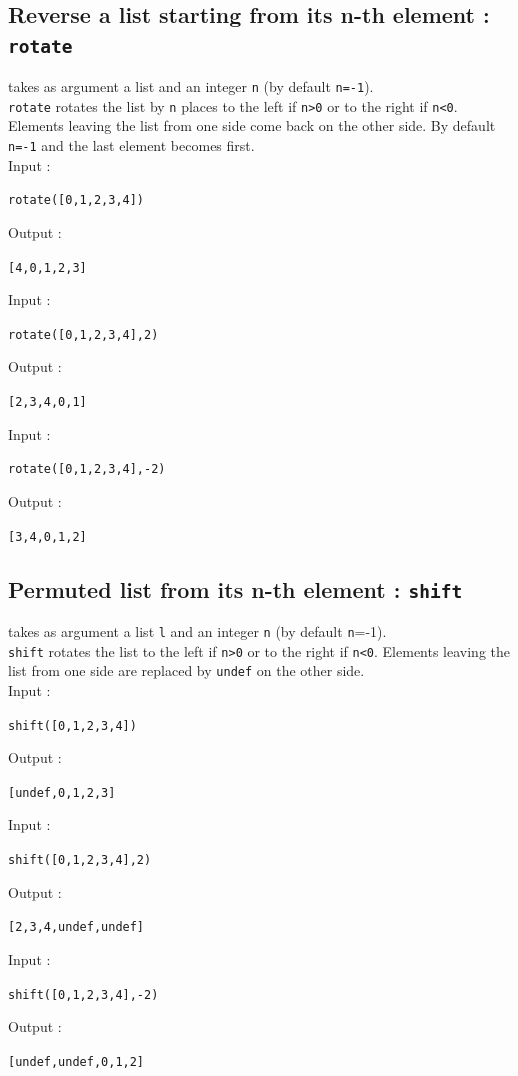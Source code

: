 \documentclass[a4paper,11pt]{book}
\begin{document}
\subsection{Reverse a list starting from its n-th element : {\tt rotate}}
 takes as argument a list and an integer {\tt n} (by 
default {\tt n=-1}).\\
{\tt rotate} rotates the list by {\tt n} places to the left if {\tt n>0}
or to the right if {\tt n<0}. Elements leaving the list from one
side come back on the other side.
By default {\tt n=-1} and the last element becomes first.\\
Input :
\begin{center}{\tt rotate([0,1,2,3,4])}\end{center}
Output :
\begin{center}{\tt  [4,0,1,2,3]}\end{center}
Input :
\begin{center}{\tt rotate([0,1,2,3,4],2)}\end{center}
Output :
\begin{center}{\tt  [2,3,4,0,1]}\end{center}
Input :
\begin{center}{\tt rotate([0,1,2,3,4],-2)}\end{center}
Output :
\begin{center}{\tt  [3,4,0,1,2]}\end{center}

\subsection{Permuted list from its n-th element : {\tt shift}}
 takes as argument a list {\tt l} and an integer {\tt n}
(by default {\tt n}=-1).\\
{\tt shift} rotates the list to the left if {\tt n>0} or to
the right if {\tt n<0}. Elements leaving the list from one side
are replaced by {\tt undef} on the other side.\\
Input :
\begin{center}{\tt shift([0,1,2,3,4])}\end{center}
Output :
\begin{center}{\tt  [undef,0,1,2,3]}\end{center}
Input :
\begin{center}{\tt shift([0,1,2,3,4],2)}\end{center}
Output :
\begin{center}{\tt  [2,3,4,undef,undef]}\end{center}
Input :
\begin{center}{\tt shift([0,1,2,3,4],-2)}\end{center}
Output :
\begin{center}{\tt  [undef,undef,0,1,2]}\end{center}
\end{document}
